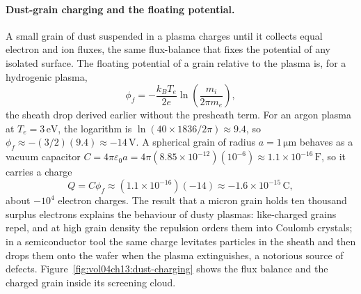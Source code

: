 \paragraph{Dust-grain charging and the floating potential.}
A small grain of dust suspended in a plasma charges until it collects equal
electron and ion fluxes, the same flux-balance that fixes the potential of
any isolated surface. The floating potential of a grain relative to the
plasma is, for a hydrogenic plasma,
\[
\phi_f = -\frac{k_B T_e}{2e}\ln\!\left(\frac{m_i}{2\pi m_e}\right),
\]
the sheath drop derived earlier without the presheath term. For an argon
plasma at $T_e = 3\,\si{\electronvolt}$, the logarithm is $\ln(40\times
1836/2\pi) \approx 9.4$, so $\phi_f \approx -(3/2)(9.4) \approx
-14\,\si{\volt}$. A spherical grain of radius $a = 1\,\si{\micro\meter}$
behaves as a vacuum capacitor $C = 4\pi\varepsilon_0 a = 4\pi(8.85\times
10^{-12})(10^{-6}) \approx 1.1\times 10^{-16}\,\si{\farad}$, so it carries a
charge
\[
Q = C\phi_f \approx (1.1\times 10^{-16})(-14) \approx -1.6\times
10^{-15}\,\si{\coulomb},
\]
about $-10^{4}$ electron charges. The result that a micron grain holds ten
thousand surplus electrons explains the behaviour of dusty plasmas:
like-charged grains repel, and at high grain density the repulsion orders
them into Coulomb crystals; in a semiconductor tool the same charge levitates
particles in the sheath and then drops them onto the wafer when the plasma
extinguishes, a notorious source of defects.
Figure~\ref{fig:vol04ch13:dust-charging} shows the flux balance and the
charged grain inside its screening cloud.



